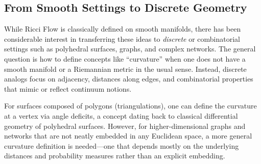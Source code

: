 \subsection{From Smooth Settings to Discrete Geometry}
While Ricci Flow is classically defined on smooth manifolds, there has been considerable interest in transferring these ideas to \emph{discrete} or combinatorial settings such as polyhedral surfaces, graphs, and complex networks. The general question is how to define concepts like ``curvature'' when one does not have a smooth manifold or a Riemannian metric in the usual sense. Instead, discrete analogs focus on adjacency, distances along edges, and combinatorial properties that mimic or reflect continuum notions.

For surfaces composed of polygons (triangulations), one can define the curvature at a vertex via angle deficits, a concept dating back to classical differential geometry of polyhedral surfaces. However, for higher-dimensional graphs and networks that are not neatly embedded in any Euclidean space, a more general curvature definition is needed—one that depends mostly on the underlying distances and probability measures rather than an explicit embedding. 